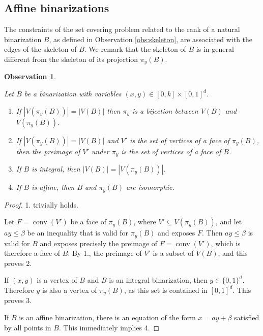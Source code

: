 \documentclass[11pt,a4paper]{article}
\newtheorem{observation}[theorem]{Observation}
\newcommand{\conv}{\operatorname{conv}}
\newcommand{\1}{\textbf{1}}
\begin{document}
\subsection{Affine binarizations} 

 The constraints of the set covering problem related to the rank of a natural binarization $B$, as defined in  Observation \ref{obs:skeleton}, are associated with the edges of the skeleton of $B$. %
We remark that the skeleton of $B$ is in general different from the skeleton of its projection $\pi_y(B)$.

\begin{observation}\label{obs:polytopes}

Let $B$ be a binarization with variables $(x,y)\in [0,k]\times [0,1]^d$.
\begin{enumerate}

\item If $|V(\pi_y(B))|=|V(B)|$ then $\pi_y$ is a bijection between $V(B)$ and $V(\pi_y(B))$.

\item If $|V(\pi_y(B))|=|V(B)|$  and $V'$ is the set of vertices of a face of $\pi_y(B)$, then the preimage of $V'$ under $\pi_y$ is the set of vertices of a 
face of $B$.

\item If $B$ is integral, then $|V(B)|=|V(\pi_y(B))|$.

\item If $B$ is affine, then $B$ and $\pi_y(B)$ are isomorphic.
\end{enumerate}
\end{observation}
\begin{proof} %
1. trivially holds.

Let $F=\conv(V')$ be a face of  $\pi_y(B)$, where $V'\subseteq V(\pi_y(B))$, and let $ay\le \beta$ be an inequality that is valid for $\pi_y(B)$ and exposes $F$. Then $ay\le \beta$ is valid for $B$ and exposes precisely the preimage of  $F=\conv(V')$, which is therefore a face of $B$. By 1., the preimage of $V'$ is a subset of $V(B)$, and this proves 2.

If $(x,y)$ is a vertex of $B$ and $B$ is an integral binarization, then $y\in\{0,1\}^d$. Therefore $y$ is also a vertex of $\pi_y(B)$, as this set is contained in $[0,1]^d$. This proves 3.

If $B$ is an affine binarization, there is an equation of the form $x=ay+\beta$  satisfied by all points in $B$. This immediately implies 4.
\end{proof}
\end{document}
